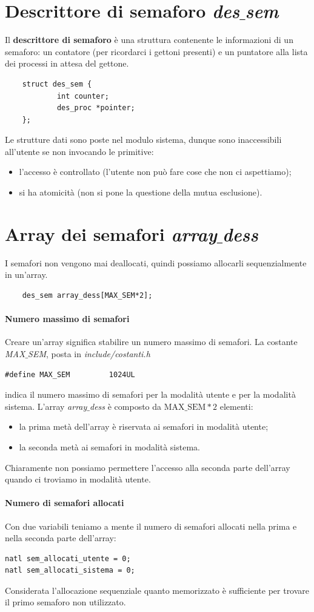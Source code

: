 \documentclass[11pt]{report}
\theoremstyle{definition}
\begin{document}
\section{Descrittore di semaforo \emph{des$\_$sem}}
Il \textbf{descrittore di semaforo} è una struttura contenente le informazioni di un semaforo: un contatore (per ricordarci i gettoni presenti) e un puntatore alla lista dei processi in attesa del gettone. 	
\begin{verbatim}
	struct des_sem {
		    int counter;
		    des_proc *pointer;	
	};
\end{verbatim}
Le strutture dati sono poste nel modulo sistema, dunque sono inaccessibili all'utente se non invocando le primitive:
\begin{itemize}
	\item l'accesso è controllato (l'utente non può fare cose che non ci aspettiamo);
	\item si ha atomicità (non si pone la questione della mutua esclusione).
\end{itemize} 
\section{Array dei semafori \emph{array$\_$dess}} 
I semafori non vengono mai deallocati, quindi possiamo allocarli sequenzialmente in un'array.
\begin{verbatim}
	des_sem array_dess[MAX_SEM*2];
\end{verbatim}
\paragraph{Numero massimo di semafori} Creare un'array significa stabilire un numero massimo di semafori. La costante \emph{MAX$\_$SEM}, posta in \emph{include/costanti.h}
\begin{verbatim}
#define MAX_SEM         1024UL
\end{verbatim}
indica il numero massimo di semafori per la modalità utente e per la modalità sistema. L'array \emph{array$\_$dess} è composto da $\text{MAX$\_$SEM}*2$ elementi:
\begin{itemize}
	\item la prima metà dell'array è riservata ai semafori in modalità utente;
	\item la seconda metà ai semafori in modalità sistema.
\end{itemize}
Chiaramente non possiamo permettere l'accesso alla seconda parte dell'array quando ci troviamo in modalità utente. 
\paragraph{Numero di semafori allocati} Con due variabili teniamo a mente il numero di semafori allocati nella prima e nella seconda parte dell'array:
\begin{verbatim}
natl sem_allocati_utente = 0;
natl sem_allocati_sistema = 0;
\end{verbatim}
Considerata l'allocazione sequenziale quanto memorizzato è sufficiente per trovare il primo semaforo non utilizzato.
\end{document}
